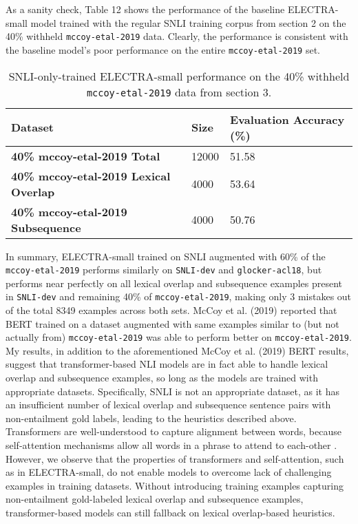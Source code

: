 \documentclass[11pt,a4paper]{article}
\begin{document}
As a sanity check, Table 12 shows the performance of the baseline ELECTRA-small model trained with the regular SNLI training corpus from section 2 on the 40\% withheld \texttt{mccoy-etal-2019} data. Clearly, the performance is consistent with the baseline model's poor performance on the entire \texttt{mccoy-etal-2019} set.

\begin{table}[hbt!]
\begin{center}
\tiny
\begin{tabular}{ p{} | p{} p{}}
  \textbf{Dataset} & \textbf{Size} & \textbf{Evaluation Accuracy} (\%)\\
  \hline
  \textbf{40\% mccoy-etal-2019 Total} & 12000 & 51.58 \\
  \textbf{40\% mccoy-etal-2019 Lexical Overlap} & 4000 & 53.64 \\
  \textbf{40\% mccoy-etal-2019 Subsequence} & 4000 & 50.76 \\
\end{tabular}
\end{center}
\caption{SNLI-only-trained ELECTRA-small performance on the 40\% withheld \texttt{mccoy-etal-2019} data from section 3.}
\end{table}

In summary, ELECTRA-small trained on SNLI augmented with 60\% of the \texttt{mccoy-etal-2019} performs similarly on \texttt{SNLI-dev} and \texttt{glocker-acl18}, but performs near perfectly on all lexical overlap and subsequence examples present in \texttt{SNLI-dev} and remaining 40\% of \texttt{mccoy-etal-2019}, making only 3 mistakes out of the total 8349 examples across both sets. McCoy et al. (2019) reported that BERT trained on a dataset augmented with same examples similar to (but not actually from) \texttt{mccoy-etal-2019} was able to perform better on \texttt{mccoy-etal-2019}. My results, in addition to the aforementioned McCoy et al. (2019) BERT results, suggest that transformer-based NLI models are in fact able to handle lexical overlap and subsequence examples, so long as the models are trained with appropriate datasets. Specifically, SNLI is not an appropriate dataset, as it has an insufficient number of lexical overlap and subsequence sentence pairs with non-entailment gold labels, leading to the heuristics described above. Transformers are well-understood to capture alignment between words, because self-attention mechanisms allow all words in a phrase to attend to each-other \cite{DBLP:journals/corr/VaswaniSPUJGKP17}. However, we observe that the properties of transformers and self-attention, such as in ELECTRA-small, do not enable models to overcome lack of challenging examples in training datasets. Without introducing training examples capturing non-entailment gold-labeled lexical overlap and subsequence examples, transformer-based models can still fallback on lexical overlap-based heuristics.
\end{document}

